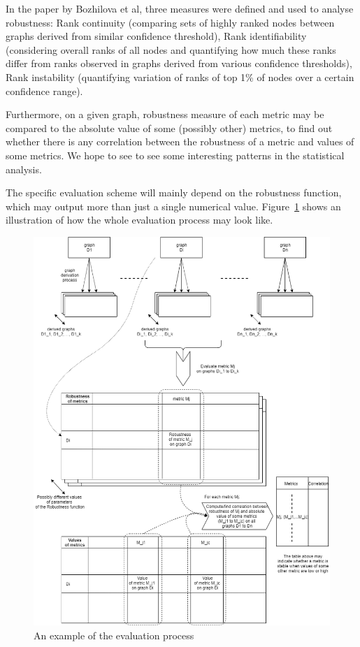 \documentclass[12pt,a4paper,twoside]{article}
\begin{document}
    	In the paper by Bozhilova et al, three measures were defined and used to analyse robustness: Rank continuity (comparing sets of highly ranked nodes between graphs derived from similar confidence threshold), Rank identifiability (considering overall ranks of all nodes and quantifying how much these ranks differ from ranks observed in graphs derived from various confidence thresholds), Rank instability (quantifying variation of ranks of top 1\% of nodes over a certain confidence range). 
    	
    	Furthermore, on a given graph, robustness measure of each metric may be compared to the absolute value of some (possibly other) metrics, to find out whether there is any correlation between the robustness of a metric and values of some metrics. We hope to see to see some interesting patterns in the statistical analysis.
    	
    	The specific evaluation scheme will mainly depend on the robustness function, which may output more than just a single numerical value. Figure~\ref{fig:example_eval} shows an illustration of how the whole evaluation process may look like.
    	
        	\begin{figure}[p!]
        	\centering
            \includegraphics[width=16cm]{images/proposal_diagram1.png}
            \caption{An example of the evaluation process}
			\label{fig:example_eval}
            \end{figure}
	
\end{document}
